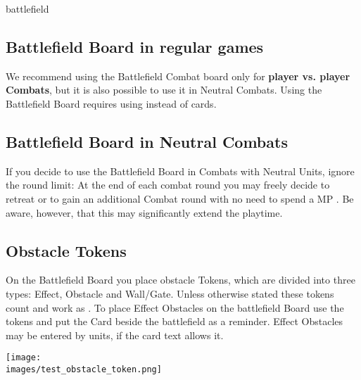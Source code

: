 \begin{expansion}{battlefield}
  \begin{multicols*}{2}
  \subsection*{Battlefield Board in regular games}
  We recommend using the Battlefield Combat board only for \textbf{player vs. player Combats}, but it is also possible to use it in Neutral Combats.
  Using the Battlefield Board requires using  instead of cards.
  
  \medskip	
  \subsection*{Battlefield Board in Neutral Combats}
  If you decide to use the Battlefield Board in Combats with Neutral Units, ignore the round limit: 
  At the end of each combat round you may freely decide to retreat or to gain an additional Combat round with no need to spend a MP . 
  Be aware, however, that this may significantly extend the playtime.
	
  \medskip
  \subsection*{Obstacle Tokens}
  On the Battlefield Board you place obstacle Tokens, which are divided into three types:
  Effect, Obstacle and Wall/Gate. 
  Unless otherwise stated these tokens count and work as .
  To place Effect Obstacles on the battlefield Board use the tokens and put the Card beside the battlefield as a reminder. 
  Effect Obstacles may be entered by units, if the card text allows it. 
  \vspace*{1em}
  \begin{center}
  \texttt{[image: \\images/test\_obstacle\_token.png]}
  \end{center}
  \vspace*{1em}
  \columnbreak
  

\end{multicols*}
\end{expansion}
